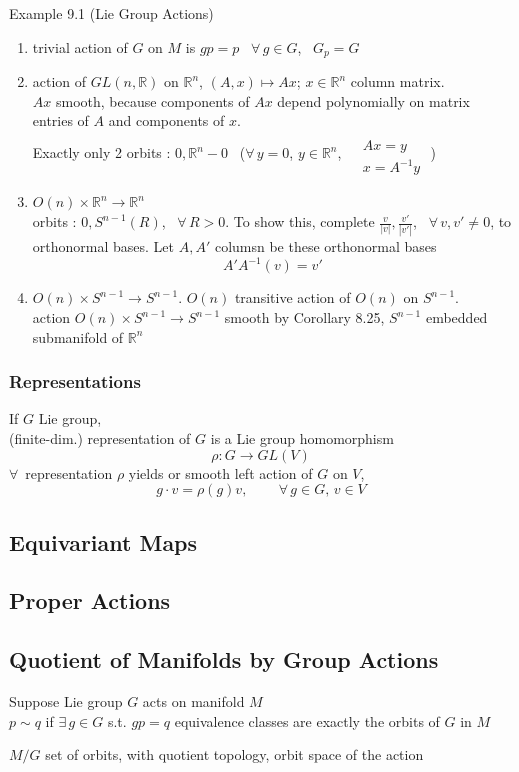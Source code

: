 \documentclass[11pt]{amsart}
\theoremstyle{definition}
\begin{document}
Example 9.1 (Lie Group Actions)
\begin{enumerate}
\item[(a)] trivial action of $G$ on $M$ is $gp = p$ \, $\forall \, g \in G$, \, $G_p = G$
\item[(b)] action of $GL(n,\mathbb{R}) $ on $\mathbb{R}^n$, $(A,x) \mapsto Ax$; $x \in \mathbb{R}^n$ column matrix.  \\
$Ax $ smooth, because components of $Ax$ depend polynomially on matrix entries of $A$ and components of $x$.  \\
Exactly only 2 orbits : $0, \mathbb{R}^n - 0$ \, ($\forall \, y =0$, $y\in \mathbb{R}^n$, $\begin{aligned} & \quad \\
  & Ax  =y \\
  & x = A^{-1}y \end{aligned}$ )
\item[(c)] $O(n) \times \mathbb{R}^n \to \mathbb{R}^n$  \\
orbits : $0, S^{n-1}(R)$, \, $\forall \, R >0$.  To show this, complete $\frac{v}{ |v|}, \frac{v'}{|v'|}$, \, $\forall \, v , v' \neq 0$, to orthonormal bases.  Let $A, A'$ columsn be these orthonormal bases
\[
A' A^{-1}(v) = v'
\]
\item[(d)] $O(n) \times S^{n-1} \to S^{n-1}$.  $O(n)$ transitive action of $O(n)$ on $S^{n-1}$.  \\
action $O(n) \times S^{n-1} \to S^{n-1}$ smooth by Corollary 8.25, $S^{n-1}$ embedded submanifold of $\mathbb{R}^n$

\end{enumerate}





\subsubsection*{Representations}

If $G$ Lie group, \\
(finite-dim.) representation of $G$ is a Lie group homomorphism
\[
\rho : G \to GL(V)
\]
$\forall \, $ representation $\rho$ yields or smooth left action of $G$ on $V$,
\[
g\cdot v = \rho(g) v , \quad \quad \, \forall \, g \in G, \, v \in V
\]


\subsection*{Equivariant Maps }

\subsection*{Proper Actions}

\subsection*{Quotient of Manifolds by Group Actions}

Suppose Lie group $G$ acts on manifold $M$ \\
$p\sim q$ if $\exists \, g \in G$ s.t. $gp = q$ \quad equivalence classes are exactly the orbits of $G$ in $M$

$M/G$ set of orbits, with quotient topology, orbit space of the action
\end{document}
